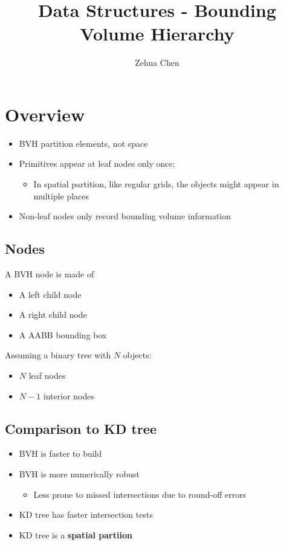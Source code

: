 \documentclass[letterpaper, 11pt]{article}
\title{Data Structures - Bounding Volume Hierarchy}
\author{Zehua Chen}
\begin{document}
  \maketitle
  \tableofcontents

  \setmainstyles

  \section{Overview}

    \begin{itemize}
      \item BVH partition elements, not space
      \item Primitives appear at leaf nodes only once;
      \begin{itemize}
        \item In spatial partition, like regular grids, the objects might
        appear in multiple places
      \end{itemize}
      \item Non-leaf nodes only record bounding volume information
    \end{itemize}

    \subsection{Nodes}

      A BVH node is made of

      \begin{itemize}
        \item A left child node
        \item A right child node
        \item A AABB bounding box
      \end{itemize}

      Assuming a binary tree with $ N $ objects:

      \begin{itemize}
        \item $ N $ leaf nodes
        \item $ N - 1 $ interior nodes
      \end{itemize}

    \subsection{Comparison to KD tree}

      \begin{itemize}
        \item BVH is faster to build
        \item BVH is more numerically robust
        \begin{itemize}
          \item Less prone to missed intersections due to round-off errors
        \end{itemize}

        \item KD tree has faster intersection tests
        \item KD tree is a \textbf{spatial partiion}
      \end{itemize}
\end{document}
